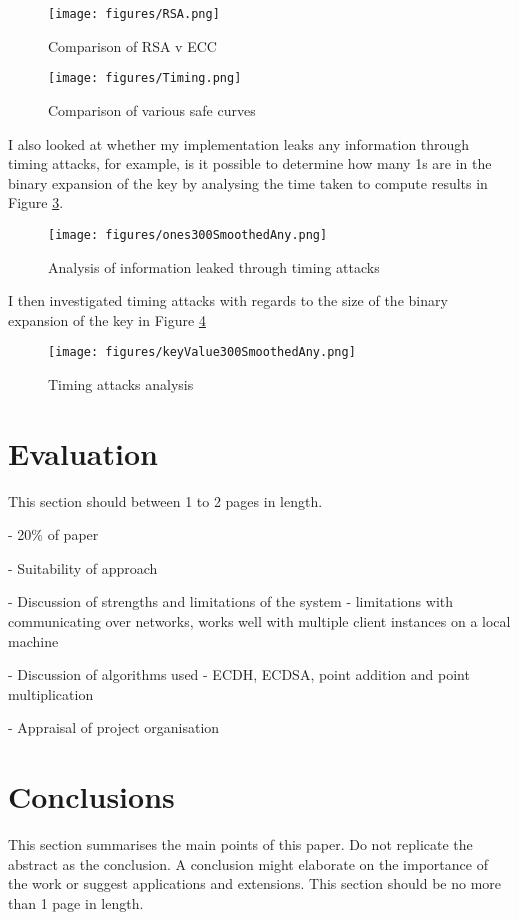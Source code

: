 \documentclass[12pt,a4paper]{article}
\begin{document}
\begin{figure}[htb]
    \centering
    \texttt{[image: figures/RSA.png]}
    \caption{Comparison of RSA v ECC}
    \label{fig:rsa}
\end{figure}


\begin{figure}[htb]
    \centering
    \texttt{[image: figures/Timing.png]}
    \caption{Comparison of various safe curves}
    \label{fig:curves}
\end{figure}

I also looked at whether my implementation leaks any information through timing attacks, 
for example, is it possible to determine how many 1s are in the binary expansion of the key by analysing the time taken to compute 
results in Figure \ref{fig:number1s}. 
\begin{figure}[htb]
    \centering
    \texttt{[image: figures/ones300SmoothedAny.png]}
    \caption{Analysis of information leaked through timing attacks}
    \label{fig:number1s}
\end{figure}

I then investigated timing attacks with regards to the size of the binary expansion of the key in Figure \ref{fig:logbase2}

\begin{figure}[htb]
    \centering
    \texttt{[image: figures/keyValue300SmoothedAny.png]}
    \caption{Timing attacks analysis}
    \label{fig:logbase2}
\end{figure}



\section{Evaluation}\noindent
This section should between 1 to 2 pages in length.

- 20\% of paper

- Suitability of approach

- Discussion of strengths and limitations of the system - limitations with communicating over networks, works well with multiple client instances on a local machine

- Discussion of algorithms used - ECDH, ECDSA, point addition and point multiplication

- Appraisal of project organisation


\section{Conclusions}\noindent
This section summarises the main points of this paper. 
Do not replicate the abstract as the conclusion. 
A conclusion might elaborate on the importance of the work or suggest applications and extensions. 
This section should be no more than 1 page in length. 
\end{document}
